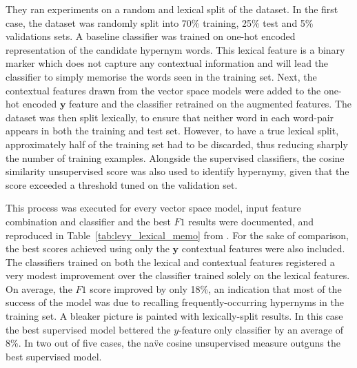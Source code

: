 They ran experiments on a random and lexical split of the dataset.  In the first case, the dataset was randomly split into 70\% training, 25\% test and 5\% validations sets.  A baseline classifier was trained on one-hot encoded representation of the candidate hypernym words.  This lexical feature is a binary marker which does not capture any contextual information and will lead the classifier to simply memorise the words seen in the training set.   Next, the contextual features drawn from the vector space models were added to the one-hot encoded $\bm{y}$ feature and the classifier retrained on the augmented features.  The dataset was then split lexically, to ensure that neither word in each word-pair appears in both the training and test set.  However, to have a true lexical split, approximately half of the training set had to be discarded, thus reducing sharply the number of training examples.  Alongside the supervised classifiers, the cosine similarity unsupervised score was also used to identify hypernymy, given that the score exceeded a threshold tuned on the validation set.

This process was executed for every vector space model, input feature combination and classifier and the best $F1$ results were documented, and reproduced in Table~\ref{tab:levy_lexical_memo} from \citet{levy2015supervised}.  For the sake of comparison, the best scores achieved using only the $\bm{y}$ contextual features were also included.  The classifiers trained on both the  lexical and contextual features registered a very modest improvement over the classifier trained solely on the lexical features.  On average, the $F1$ score improved by only 18\%, an indication that most of the success of the model was due to recalling frequently-occurring hypernyms in the training set.  A bleaker picture is painted with lexically-split results.  In this case the best supervised model bettered the $y$-feature only classifier by an average of 8\%.  In two out of five cases, the na\"ve cosine unsupervised measure outguns the best supervised model.  


